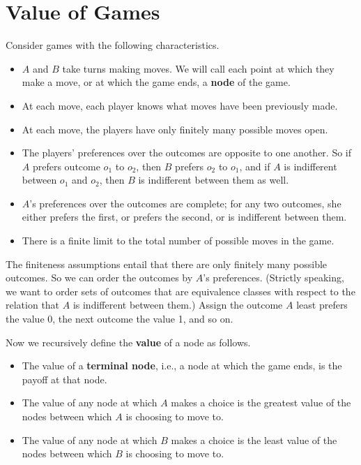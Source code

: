 \documentclass[openany]{book}
\begin{document}
\section{Value of Games}

Consider games with the following characteristics.

\begin{itemize}
\item $A$ and $B$ take turns making moves. We will call each point at which they make a move, or at which the game ends, a \textbf{node} of the game.
\item At each move, each player knows what moves have been previously made.
\item At each move, the players have only finitely many possible moves open.
\item The players' preferences over the outcomes are opposite to one another. So if $A$ prefers outcome $o_1$ to $o_2$, then $B$ prefers $o_2$ to $o_1$, and if $A$ is indifferent between $o_1$ and $o_2$, then $B$ is indifferent between them as well.
\item $A$'s preferences over the outcomes are complete; for any two outcomes, she either prefers the first, or prefers the second, or is indifferent between them.
\item There is a finite limit to the total number of possible moves in the game.
\end{itemize}

\noindent The finiteness assumptions entail that there are only finitely many possible outcomes. So we can order the outcomes by $A$'s preferences. (Strictly speaking, we want to order sets of outcomes that are equivalence classes with respect to the relation that $A$ is indifferent between them.) Assign the outcome $A$ least prefers the value 0, the next outcome the value 1, and so on.

Now we recursively define the \textbf{value} of a node as follows.

\begin{itemize}
\item The value of a \textbf{terminal node}, i.e., a node at which the game ends, is the payoff at that node.
\item The value of any node at which $A$ makes a choice is the greatest value of the nodes between which $A$ is choosing to move to.
\item The value of any node at which $B$ makes a choice is the least value of the nodes between which $B$ is choosing to move to.
\end{itemize}
\end{document}
